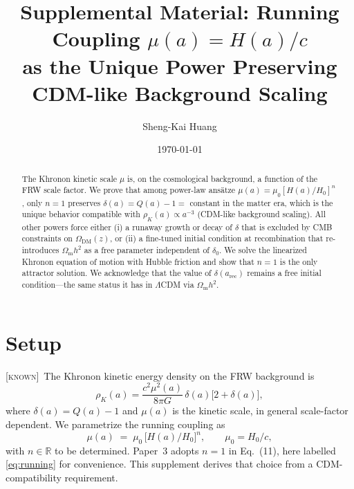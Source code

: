 \documentclass[prd,twocolumn,superscriptaddress,longbibliography,floatfix]{revtex4-2}
\newcommand{\Hzero}{H_{0}}
\newcommand{\muzero}{\mu_{0}}
\newcommand{\OmegaDM}{\Omega_{\mathrm{DM}}}
\newcommand{\Omegam}{\Omega_{\mathrm{m}}}
\newcommand{\known}{\textsc{[known]}}
\begin{document}
\title{Supplemental Material: Running Coupling
$\mu(a) = H(a)/c$\\ as the Unique Power
Preserving CDM-like Background Scaling}

\author{Sheng-Kai Huang}

\date{\today}

\begin{abstract}
The Khronon kinetic scale $\mu$ is, on the cosmological
background, a function of the FRW scale factor.  We
prove that among power-law ans\"atze
$\mu(a) = \muzero[H(a)/\Hzero]^{n}$, only $n = 1$
preserves $\delta(a) = Q(a) - 1 = $ constant in the
matter era, which is the unique behavior compatible
with $\rho_{K}(a) \propto a^{-3}$ (CDM-like background
scaling).  All other powers force either (i) a runaway
growth or decay of $\delta$ that is excluded by CMB
constraints on $\OmegaDM(z)$, or (ii) a fine-tuned
initial condition at recombination that re-introduces
$\Omegam h^{2}$ as a free parameter independent of
$\delta_{0}$.  We solve the linearized Khronon
equation of motion with Hubble friction and show that
$n = 1$ is the only attractor solution.  We acknowledge
that the value of $\delta(a_{\mathrm{rec}})$ remains a
free initial condition---the same status it has in
$\Lambda$CDM via $\Omegam h^{2}$.
\end{abstract}

\maketitle

\section{Setup}
\label{sec:setup}

\known\ The Khronon kinetic energy density on the FRW
background is~\cite{BS2024}
\begin{equation}
\rho_{K}(a) = \frac{c^{2}\mu^{2}(a)}{8\pi G}\,
\delta(a)\bigl[2 + \delta(a)\bigr],
\label{eq:rhoK}
\end{equation}
where $\delta(a) = Q(a) - 1$ and $\mu(a)$ is the
kinetic scale, in general scale-factor dependent.  We
parametrize the running coupling as
\begin{equation}
\mu(a) \;=\; \muzero\,\bigl[H(a)/\Hzero\bigr]^{n},
\qquad \muzero = \Hzero/c,
\label{eq:running}
\end{equation}
with $n \in \mathbb{R}$ to be determined.  Paper~3
adopts $n = 1$ in Eq.~(11), here labelled
\eqref{eq:running} for convenience.  This supplement
derives that choice from a CDM-compatibility
requirement.
\end{document}
